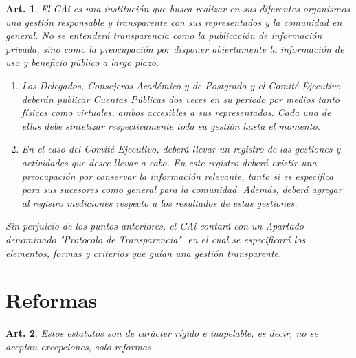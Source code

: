 \documentclass[letterpaper,11pt]{article}
\theoremstyle{plain}
\newtheorem{art}{Art.} %
\begin{document}
			\begin{art}\label{definicionProtocoloTransparencia}
				El CAi es una institución que busca realizar en sus diferentes organismos una gestión responsable y transparente con sus representados y la comunidad en general. No se entenderá transparencia como la publicación de información privada, sino como la preocupación por disponer abiertamente la información de uso y beneficio público a largo plazo.
				\begin{enumerate}
					\item Los Delegados, Consejeros Académico y de Postgrado y el Comité Ejecutivo deberán publicar Cuentas Públicas dos veces en su periodo por medios tanto físicos como virtuales, ambos accesibles a sus representados. Cada una de ellas debe sintetizar respectivamente toda su gestión hasta el momento.
					\item En el caso del Comité Ejecutivo, deberá llevar un registro de las gestiones y actividades que desee llevar a cabo. En este registro deberá existir una preocupación por conservar la información relevante, tanto si es específica para sus sucesores como general para la comunidad. Además, deberá agregar al registro mediciones respecto a los resultados de estas gestiones.
				\end{enumerate}
				Sin perjuicio de los puntos anteriores, el CAi contará con un Apartado denominado "Protocolo de Transparencia", en el cual se especificará los elementos, formas y criterios que guían una gestión transparente.
			\end{art}

	\section{Reformas}\label{reformas}

		\begin{art}
			Estos estatutos son de carácter rígido e inapelable, es decir, no se aceptan excepciones, solo reformas.
		\end{art}
\end{document}
